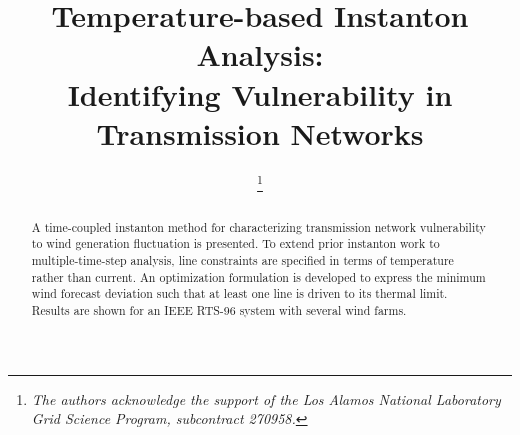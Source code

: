 \documentclass[conference]{IEEEtran}
\begin{document}
%
\title{Temperature-based Instanton Analysis: \\
Identifying Vulnerability in Transmission Networks}


\author{%

\and
{}
\and
{}

%

\thanks{\emph{The authors acknowledge the support of the Los Alamos National Laboratory Grid Science Program, subcontract 270958.}}%
}

\maketitle

\begin{abstract}
A time-coupled instanton method for characterizing transmission network vulnerability to wind generation fluctuation is presented. To extend prior instanton work to multiple-time-step analysis, line constraints are specified in terms of temperature rather than current. An optimization formulation is developed to express the minimum wind forecast deviation such that at least one line is driven to its thermal limit. Results are shown for an IEEE RTS-96 system with several wind farms.
\end{abstract}
\end{document}
